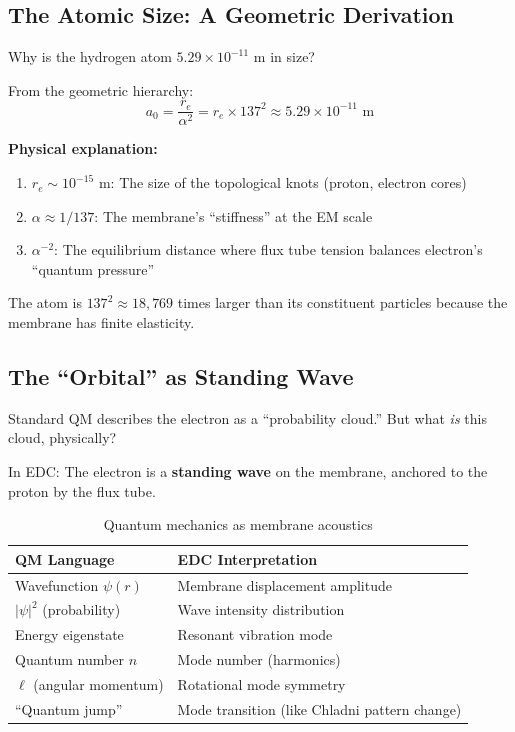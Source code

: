 \subsection{The Atomic Size: A Geometric Derivation}
\label{subsec:atomic_size}

Why is the hydrogen atom $5.29 \times 10^{-11}$ m in size?

From the geometric hierarchy:
\begin{equation}
\boxed{a_0 = \frac{r_e}{\alpha^2} = r_e \times 137^2 \approx 5.29 \times 10^{-11} \text{ m}}
\end{equation}

\textbf{Physical explanation:}
\begin{enumerate}
    \item $r_e \sim 10^{-15}$ m: The size of the topological knots (proton, electron cores)
    \item $\alpha \approx 1/137$: The membrane's ``stiffness'' at the EM scale
    \item $\alpha^{-2}$: The equilibrium distance where flux tube tension balances electron's ``quantum pressure''
\end{enumerate}

The atom is $137^2 \approx 18,769$ times larger than its constituent particles because the membrane has finite elasticity.

\subsection{The ``Orbital'' as Standing Wave}
\label{subsec:orbital}

Standard QM describes the electron as a ``probability cloud.'' But what \textit{is} this cloud, physically?

In EDC: The electron is a \textbf{standing wave} on the membrane, anchored to the proton by the flux tube.

\begin{table}[h]
\centering
\begin{tabular}{|l|l|}
\hline
\textbf{QM Language} & \textbf{EDC Interpretation} \\
\hline
Wavefunction $\psi(r)$ & Membrane displacement amplitude \\
$|\psi|^2$ (probability) & Wave intensity distribution \\
Energy eigenstate & Resonant vibration mode \\
Quantum number $n$ & Mode number (harmonics) \\
$\ell$ (angular momentum) & Rotational mode symmetry \\
``Quantum jump'' & Mode transition (like Chladni pattern change) \\
\hline
\end{tabular}
\caption{Quantum mechanics as membrane acoustics}
\label{tab:qm_edc}
\end{table}

